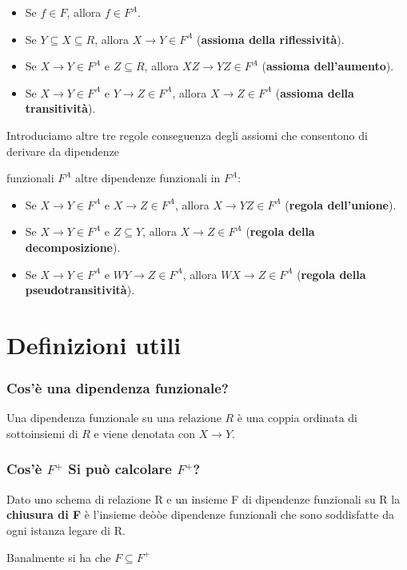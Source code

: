 \documentclass{article}
\begin{document}
\begin{itemize}
  \item Se $f\in F$, allora $f\in F^A$.
  \item Se $Y\subseteq X\subseteq R$, allora $X\to Y\in F^A$ (\textbf{assioma della riflessività}).
  \item Se $X\to Y\in F^A$ e $Z\subseteq R$, allora $XZ\to YZ\in F^A$ (\textbf{assioma dell'aumento}).
  \item Se $X\to Y\in F^A$ e $Y\to Z\in F^A$, allora $X\to Z\in F^A$ (\textbf{assioma della transitività}).
\end{itemize}

Introduciamo altre tre regole conseguenza degli assiomi che consentono di derivare da dipendenze \par funzionali $F^A$ altre dipendenze funzionali in $F^A$:

\begin{itemize}
  \item Se $X\to Y\in F^A$ e $X\to Z\in F^A$, allora $X \to YZ\in F^A$ (\textbf{regola dell'unione}).
  \item Se $X\to Y\in F^A$ e $Z\subseteq Y$, allora $X \to Z\in F^A$ (\textbf{regola della decomposizione}).
  \item Se $X\to Y\in F^A$ e $WY\to Z\in F^A$, allora $WX\to Z\in F^A$ (\textbf{regola della pseudotransitività}).
\end{itemize}





\pagebreak


\section{Definizioni utili}
\subsubsection{Cos'è una dipendenza funzionale?}
Una dipendenza funzionale su una relazione $R$ è una coppia ordinata di sottoinsiemi di $R$ e viene denotata con $X \rightarrow Y$.\\

\subsubsection{Cos'è $F^+$ Si può calcolare $F^+$?}
Dato uno schema di relazione R e un insieme F di dipendenze funzionali su R la \textbf{chiusura di F} è l'insieme deòòe dipendenze funzionali che sono soddisfatte da ogni istanza legare di R.\par
Banalmente si ha che $F \subseteq F^+$
\end{document}
